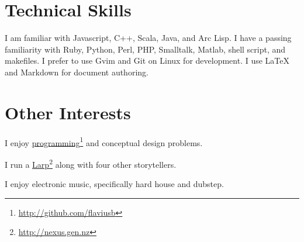 \documentclass[10pt,oneside]{memoir}
\def\mybibliostyle{plain}
\def\bibliocommand{}
\begin{document}
{}
\section*{Technical Skills}
\label{technicalskills}

I am familiar with Javascript, C++, Scala, Java, and Arc Lisp. I have a passing familiarity with Ruby, Python, Perl, PHP, Smalltalk, Matlab, shell script, and makefiles. I prefer to use Gvim and Git on Linux for development. I use LaTeX and Markdown for document authoring.


{}
\section*{Other Interests}
\label{otherinterests}

I enjoy \href{http://github.com/flaviusb}{programming}\footnote{\href{http://github.com/flaviusb}{http://github.com/flaviusb}} and conceptual design problems.

I run a \href{http://nexus.gen.nz}{Larp}\footnote{\href{http://nexus.gen.nz}{http://nexus.gen.nz}} along with four other storytellers.

I enjoy electronic music, specifically hard house and dubstep.


%
%

\backmatter


\bibliocommand

\printglossary


\printindex
\end{document}
